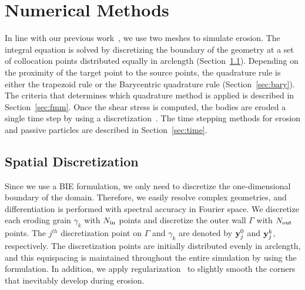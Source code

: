 \documentclass{jfm}
\begin{document}
\section{Numerical Methods}
\label{sec:method}
In line with our previous work~\citep{qua-moo2018}, we use two meshes to
simulate erosion. The integral equation is solved by discretizing the
boundary of the geometry at a set of collocation points distributed
equally in arclength (Section~\ref{sec:spatialDiscretization}).
Depending on the proximity of the target point to the source points, the
quadrature rule is either the trapezoid rule or the Barycentric
quadrature rule (Section~\ref{sec:bary}).  The criteria that determines
which quadrature method is applied is described in
Section~\ref{sec:fmm}.  Once the shear stress is computed, the bodies
are eroded a single time step by using a {\thL}
discretization~\citep{hou-low-she1994, moore2013self}.  The time
stepping methods for erosion and passive particles are described in
Section~\ref{sec:time}.

\subsection{Spatial Discretization}
\label{sec:spatialDiscretization}
Since we use a BIE formulation, we only need to discretize the
one-dimensional boundary of the domain.  Therefore, we easily resolve
complex geometries, and differentiation is performed with spectral
accuracy in Fourier space.  We discretize each eroding grain $\gamma_k$
with $N_{\mathrm{in}}$ points and discretize the outer wall $\Gamma$ with
$N_{\mathrm{out}}$ points.  The $j^{th}$ discretization point on $\Gamma$ and
$\gamma_k$ are denoted by ${\mathbf{y}}_j^0$ and ${\mathbf{y}}^k_j$, respectively.  The
discretization points are initially distributed evenly in arclength, and
this equispacing is maintained throughout the entire simulation by using
the {\thL} formulation.  In addition, we apply
regularization~\citep{qua-moo2018} to slightly smooth the corners that
inevitably develop during erosion.
\end{document}
